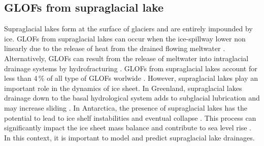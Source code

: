 \subsection{GLOFs from supraglacial lake}


Supraglacial lakes form at the surface of glaciers and are entirely impounded by ice. GLOFs from supraglacial lakes can occur when the ice-spillway lower non linearly due to the release of heat from the drained flowing meltwater \citep{RaymondNolan2000}. Alternatively, GLOFs can result from the release of meltwater into intraglacial drainage systems by hydrofracturing \citep[e.g.][]{Bjornsson1976, Boon&Sharp2003}. GLOFs from supraglacial lakes account for less than 4\,\% of all type of GLOFs worlwide \citep{Lutzow&al2023}. However, supraglacial lakes play an important role in the dynamics of ice sheet. In Greenland, supraglacial lakes drainage down to the basal hydrological
system adds to subglacial lubrication and may increase sliding \citep[e.g.][]{Schoof2010,Pimentel&Flowers2011,Tedesco&al2013}. In Antarctica, the presence of supraglacial lakes has the potential to lead to ice shelf instabilities and eventual collapse \citep[e.g.][]{Banwell&al2013,Banwell&al2019}. This process can significantly impact the ice sheet mass balance and contribute to sea level rise \citep{Van&al2022}. In this context, it is important to model and predict supraglacial lake drainages. 

